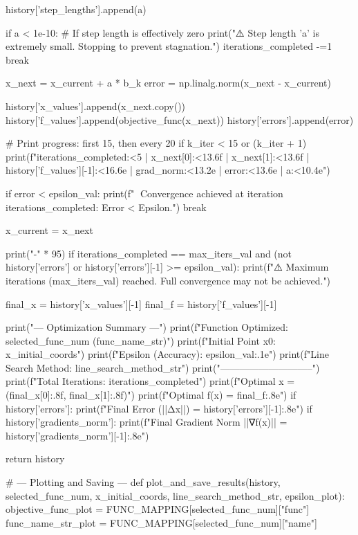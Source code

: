 \documentclass[12pt]{article} %
\begin{document}
\begin{python}
        history['step_lengths'].append(a)

        if a < 1e-10: # If step length is effectively zero
            print("\n⚠️ Step length 'a' is extremely small. Stopping to prevent stagnation.")
            iterations_completed -=1 
            break

        x_next = x_current + a * b_k
        error = np.linalg.norm(x_next - x_current)

        history['x_values'].append(x_next.copy())
        history['f_values'].append(objective_func(x_next))
        history['errors'].append(error)
        
        # Print progress: first 15, then every 20%
        if k_iter < 15 or (k_iter + 1) %
            print(f"{iterations_completed:<5} | {x_next[0]:<13.6f} | {x_next[1]:<13.6f} | {history['f_values'][-1]:<16.6e} | {grad_norm:<13.2e} | {error:<13.6e} | {a:<10.4e}")

        if error < epsilon_val:
            print(f"\n🏁 Convergence achieved at iteration {iterations_completed}: Error < Epsilon.")
            break
        
        x_current = x_next

    print("-" * 95)
    if iterations_completed == max_iters_val and (not history['errors'] or history['errors'][-1] >= epsilon_val):
        print(f"\n⚠️ Maximum iterations ({max_iters_val}) reached. Full convergence may not be achieved.")
    
    final_x = history['x_values'][-1]
    final_f = history['f_values'][-1]
    
    print("\n--- Optimization Summary ---")
    print(f"Function Optimized: {selected_func_num} ({func_name_str})")
    print(f"Initial Point x0: {x_initial_coords}")
    print(f"Epsilon (Accuracy): {epsilon_val:.1e}")
    print(f"Line Search Method: {line_search_method_str}")
    print("-----------------------------")
    print(f"Total Iterations: {iterations_completed}")
    print(f"Optimal x = ({final_x[0]:.8f}, {final_x[1]:.8f})")
    print(f"Optimal f(x) = {final_f:.8e}")
    if history['errors']:
        print(f"Final Error (||Δx||) = {history['errors'][-1]:.8e}")
    if history['gradients_norm']:
         print(f"Final Gradient Norm ||∇f(x)|| = {history['gradients_norm'][-1]:.8e}")

    return history

# --- Plotting and Saving ---
def plot_and_save_results(history, selected_func_num, x_initial_coords, line_search_method_str, epsilon_plot):
    objective_func_plot = FUNC_MAPPING[selected_func_num]["func"]
    func_name_str_plot = FUNC_MAPPING[selected_func_num]["name"]


\end{python}
\end{document}
